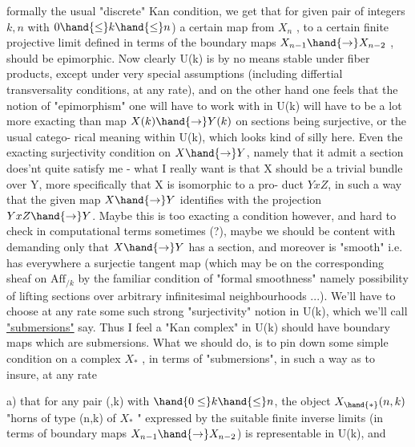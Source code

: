 
formally the usual "discrete" Kan condition, we get that \hand{(}for given pair
of integers $k,n$ with $0\hand{\leq}k\hand{\leq}n$) a certain map from $X_n$ , to a certain
 finite projective limit defined in terms of the boundary
maps $X_{n-1}\hand{\to}X_{n-2}$ , should be  epimorphic. Now clearly U(k)
is by no means stable under fiber products, except under very special
assumptions (including differtial transversality conditions, at any
rate), and on the other hand one feels that the notion of "epimorphism"
one will have to work with in U(k) will have to be a lot more exacting
than  map $X(k)\hand{\to}Y(k)$ on sections being surjective, or the usual catego-%
rical meaning within U(k), which looks kind of silly here. Even the 
exacting surjectivity condition on $X\hand{\to}Y$, namely that it admit a section\hand{\unsure{,}}
does'nt quite satisfy me - what I really want is that X should be a
trivial bundle over Y, more specifically that X is isomorphic to a pro-%
duct $YxZ$, in such a way that the given map $X\hand{\to}Y$ identifies with the
projection $YxZ\hand{\to}Y$. Maybe this is too exacting a condition however, and
hard to check in computational terms sometimes (?), maybe we should be
content with demanding only that $X\hand{\to}Y$ has a section, and moreover is
"smooth" i.e. has everywhere a surjectie tangent map (which may be
  on the corresponding sheaf on $\mathrm{Aff}_{/k}$ by the familiar condition
of "formal smoothness" namely possibility of lifting sections over
arbitrary infinitesimal neighbourhoods ...). We'll have to choose at any
rate some such  strong "surjectivity" notion in U(k), which we'll
call \uline{"submersions"} say. Thus I feel a "Kan complex" in U(k) should have
boundary maps which are submersions. What we should do, is to pin down
some simple  condition on a complex $X_*$ , in terms of "submersions",
in such a way as to insure, at any rate

a) that for any pair (,k) with $\hand{0\leq}k\hand{\leq}n$, the object $X_{\hand{*}}(n,k)$
"horns of type (n,k) of $X_*$ "\hand{,} expressed by the suitable finite inverse
limits (in terms of boundary maps $X_{n-1}\hand{\to}X_{n-2}$) is representable in U(k),
and

